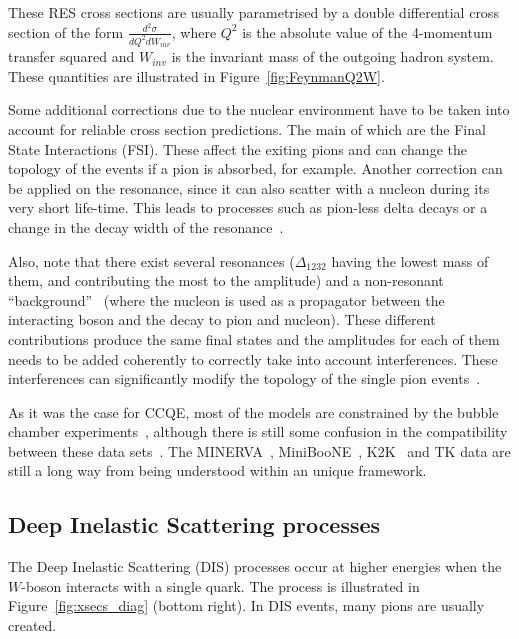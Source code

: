 These \Gls{RES} cross sections are usually parametrised by a
double differential cross section of the form
$\frac{d^2\sigma}{dQ^2dW_{inv}}$, where $Q^2$ is the absolute value of
the 4-momentum transfer squared and $W_{inv}$ is the invariant mass of
the outgoing hadron system. These quantities are illustrated in
Figure~\ref{fig:FeynmanQ2W}.

Some additional corrections due to the nuclear environment have to be
taken into account for reliable cross section predictions. The main of
which are the Final State Interactions (\Gls{FSI}). These affect the
exiting pions and can change the topology of the events if a pion is
absorbed, for example. Another correction can be applied on the
resonance, since it can also scatter with a nucleon during its very
short life-time. This leads to processes such as pion-less delta
decays or a change in the decay width of the
resonance~\cite{Oset1987,Singh1998}.

Also, note that there exist several resonances ($\Delta_{1232}$ having
the lowest mass of them, and contributing the most to the amplitude)
and a non-resonant ``background''~\cite{Background} (where the nucleon
is used as a propagator between the interacting boson and the decay to
pion and nucleon). These different contributions produce the same
final states and the amplitudes for each of them needs to be added
coherently to correctly take into account interferences. These
interferences can significantly modify the topology of the single pion
events~\cite{Minoo}.

As it was the case for \Gls{CCQE}, most of the models are constrained
by the bubble chamber experiments~\cite{ANLPion,ANLNCPion,BNLPion},
although there is still some confusion in the compatibility between
these data sets~\cite{Wilkinson:2014yfa}. The
\Gls{MINERVA}~\cite{MINERvACCPion},
\Gls{MiniBooNE}~\cite{MiniBooNECC1PiP,MiniBooNECC1Piz,MiniBooNENCPi0},
\Gls{K2K}~\cite{K2KPion} and \Gls{TK} data are still a long way from
being understood within an unique framework.

\subsection{Deep Inelastic Scattering processes}
The Deep Inelastic Scattering (\Gls{DIS}) processes occur at higher
energies when the $W$-boson interacts with a single quark. The process
is illustrated in Figure~\ref{fig:xsecs_diag} (bottom right). In DIS
events, many pions are usually created.

